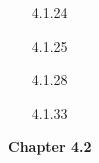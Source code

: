 \documentclass[10pt,twoside,reqno]{article}
\begin{document}
\begin{enumerate}
\vspace{3mm}
\item[4.1.24]
\vspace{3mm}

\vspace{3mm}
\item[4.1.25]
\vspace{3mm}

\vspace{3mm}
\item[4.1.28]
\vspace{3mm}

\vspace{3mm}
\item[4.1.33]
\vspace{3mm}

\vspace{3mm}
\end{enumerate}
\vspace{5mm}
\textbf{Chapter 4.2}
\end{document}
